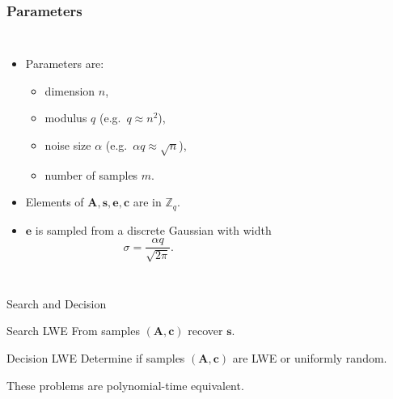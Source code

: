 \documentclass[10pt,compress]{beamer}
\newcommand{\vs}{\vspace{5mm}}
\renewcommand{\vec}[1]{\mathbf{#1}\xspace}
\renewcommand{\vec}[1]{\mathbf{#1}\xspace}
\begin{document}
\begin{frame}
  \frametitle{Parameters}

  \begin{columns}
    \begin{itemize}
    \item Parameters are: 
      \begin{itemize}
      \item dimension $n$, 
      \item modulus $q$ (e.g.\ $q \approx n^2$), 
      \item noise size $\alpha$ (e.g.\ $\alpha q \approx \sqrt{n}$),
      \item number of samples $m$.
      \end{itemize}

    \item Elements of $\vec{A}, \vec{s}, \vec{e}, \vec{c}$ are in $\mathbb{Z}_q$.
    \item $\vec{e}$ is sampled from a discrete Gaussian with width \[\sigma=\frac{\alpha q}{\sqrt{2 \pi}}.\]
    \end{itemize}
  \end{columns}
\end{frame}

\begin{frame}{Search and Decision}
  \begin{alertblock}{Search LWE}
    From samples $(\vec{A},\vec{c})$ recover $\vec{s}$.
  \end{alertblock}

  \vs{}

  \begin{alertblock}{Decision LWE}
    Determine if samples $(\vec{A},\vec{c})$ are LWE or uniformly random.
  \end{alertblock}

  \vs{}

  These problems are polynomial-time equivalent.

\end{frame}
\end{document}
